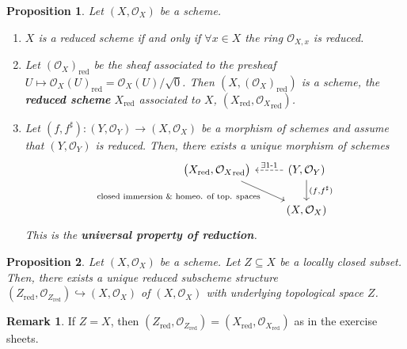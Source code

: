 \documentclass[12pt]{article}
\newtheorem*{proposition}{Proposition}
\theoremstyle{definition}
\newtheorem*{remark}{Remark}
\theoremstyle{remark}
\begin{document}
\begin{proposition}
Let $(X,\mathcal{O}_X)$ be a scheme.

\begin{enumerate}[label=\arabic*)]
\item $X$ is a reduced scheme if and only if $\forall x\in X$ the ring $\mathcal{O}_{X,x}$ is reduced.

\item Let $(\mathcal{O}_X)_{\text{red}}$ be the sheaf associated to the presheaf $U\mapsto\mathcal{O}_X(U)_{\text{red}}=\mathcal{O}_X(U)/\sqrt{0}$. Then $(X,(\mathcal{O}_X)_{\text{red}})$ is a scheme, the \textbf{reduced scheme} $X_{\text{red}}$ associated to $X$, $(X_{\text{red}},{\mathcal{O}_X}_{\text{red}})$.

\item Let $(f,f^{\sharp}):(Y,\mathcal{O}_Y)\rightarrow(X,\mathcal{O}_X)$ be a morphism of schemes and assume that $(Y,\mathcal{O}_Y)$ is reduced. Then, there exists a unique morphism of schemes
\[
\begin{tikzcd}
\big(X_{\text{red}},{\mathcal{O}_X}_{\text{red}}\big)\arrow[rd,"\text{closed immersion \& homeo. of top. spaces}",swap]&(Y,\mathcal{O}_Y)\arrow[l,dashed,"\exists1\text{-}1",swap]\arrow[d,"(f{,}f^{\sharp})"]\\
&(X,\mathcal{O}_X)
\end{tikzcd}
\]
This is the \textbf{universal property of reduction}.
\end{enumerate}
\end{proposition}

\begin{proposition}
Let $(X,\mathcal{O}_X)$ be a scheme. Let $Z\subseteq X$ be a locally closed subset. Then, there exists a unique reduced subscheme structure $(Z_{\text{red}},\mathcal{O}_{Z_{\text{red}}})\hookrightarrow(X,\mathcal{O}_X)$ of $(X,\mathcal{O}_X)$ with underlying topological space $Z$.
\end{proposition}

\begin{remark}
If $Z=X$, then $(Z_{\text{red}},\mathcal{O}_{Z_{\text{red}}})=(X_{\text{red}},\mathcal{O}_{X_{\text{red}}})$ as in the exercise sheets.
\end{remark}
\end{document}
